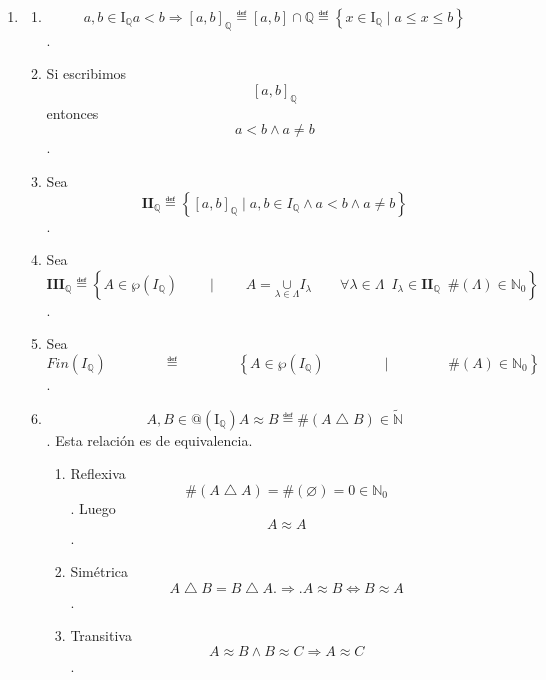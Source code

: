 \documentclass[
]{article}
\begin{document}
\begin{enumerate}
  \begin{enumerate}
  \def\labelenumii{\arabic{enumii}.}
  \item
    \begin{enumerate}
    \def\labelenumiii{\arabic{enumiii}.}
    \item
      \[a,{b \in \mathbf{\mathrm{I}}_{\mathbb{Q}}}{a < b}\Rightarrow\left\lbrack {a,b} \right\rbrack_{\mathbb{Q}} ≝ {\left\lbrack {a,b} \right\rbrack \cap \mathbb{Q}} ≝ \left\{ {{x \in \mathbf{\mathrm{I}}_{\mathbb{Q}}} \mid {{a \leq x} \leq b}} \right\}\].
    \item
      Si escribimos \[\left\lbrack {a,b} \right\rbrack_{\mathbb{Q}}\]
      entonces \[{a < {b \land a}} \neq b\].
    \item
      Sea
      \[\mathbf{II}_{\mathbb{Q}} ≝ \left\{ {\left\lbrack {a,b} \right\rbrack_{\mathbb{Q}} \mid {a,{{{b \in {I_{\mathbb{Q}} \land a}} < {b \land a}} \neq b}}} \right\}\].
    \item
      Sea
      \[\mathbf{III}_{\mathbb{Q}}≝\left\{ {{A \in {\wp\left( I_{\mathbb{Q}} \right)}}\qquad \mid \qquad{{A = \underset{\lambda \in \Lambda}{\mathbf{\cup}}}I_{\lambda}\qquad\forall{\lambda \in \Lambda}\mspace{9mu}{I_{\lambda} \in {\mathbf{II}_{\mathbb{Q}}\mspace{9mu}{{\#(\Lambda)} \in {\mathbb{N}}_{0}}}}}} \right\}\]
      .
    \item
      Sea
      \[\mathit{Fin}\left( I_{\mathbb{Q}} \right)\mspace{72mu} ≝\mspace{72mu}\left\{ {{A \in \wp}\left( I_{\mathbb{Q}} \right)\mspace{72mu} \mid \mspace{72mu}\#{(A) \in {\mathbb{N}}_{0}}} \right\}\].
    \item
      \[A,B{\in}{@\left( \mathbf{\mathrm{I}}_{\mathbb{Q}} \right)}{A \approx B} ≝ {\#{\left( {A \bigtriangleup B} \right) \in \widetilde{\mathbb{N}}}}\].
      Esta relación es de equivalencia.

      \begin{enumerate}
      \def\labelenumiv{\arabic{enumiv}.}
      \item
        Reflexiva
        \[\#{\left( {A\bigtriangleup A} \right) = \#}{(\varnothing) = 0 \in {\mathbb{N}}_{0}}\].
        Luego \[A \approx A\].
      \item
        Simétrica
        \[A \bigtriangleup {B = B} \bigtriangleup A.\Rightarrow.A \approx B\Leftrightarrow B \approx A\].
      \item
        Transitiva
        \[A \approx {B \land B} \approx C\Rightarrow A \approx C\].


\end{enumerate}
\end{enumerate}
\end{enumerate}
\end{enumerate}
\end{document}
